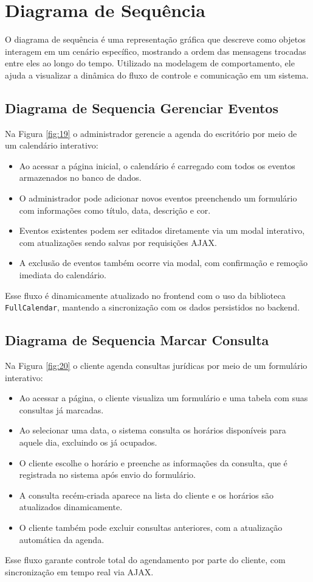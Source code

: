 \section{Diagrama de Sequência}
O diagrama de sequência é uma representação gráfica que descreve como objetos interagem em um cenário específico, mostrando a ordem das mensagens trocadas entre eles ao longo do tempo. Utilizado na modelagem de comportamento, ele ajuda a visualizar a dinâmica do fluxo de controle e comunicação em um sistema.


\subsection{Diagrama de Sequencia Gerenciar Eventos}

Na Figura \ref{fig:19} o administrador gerencie a agenda do escritório por meio de um calendário interativo:

\begin{itemize} \item Ao acessar a página inicial, o calendário é carregado com todos os eventos armazenados no banco de dados. \item O administrador pode adicionar novos eventos preenchendo um formulário com informações como título, data, descrição e cor. \item Eventos existentes podem ser editados diretamente via um modal interativo, com atualizações sendo salvas por requisições AJAX. \item A exclusão de eventos também ocorre via modal, com confirmação e remoção imediata do calendário. \end{itemize}
Esse fluxo é dinamicamente atualizado no frontend com o uso da biblioteca \texttt{FullCalendar}, mantendo a sincronização com os dados persistidos no backend.


\subsection{Diagrama de Sequencia Marcar Consulta}

Na Figura \ref{fig:20} o cliente agenda consultas jurídicas por meio de um formulário interativo:

\begin{itemize} \item Ao acessar a página, o cliente visualiza um formulário e uma tabela com suas consultas já marcadas. \item Ao selecionar uma data, o sistema consulta os horários disponíveis para aquele dia, excluindo os já ocupados. \item O cliente escolhe o horário e preenche as informações da consulta, que é registrada no sistema após envio do formulário. \item A consulta recém-criada aparece na lista do cliente e os horários são atualizados dinamicamente. \item O cliente também pode excluir consultas anteriores, com a atualização automática da agenda. 
\end{itemize}
Esse fluxo garante controle total do agendamento por parte do cliente, com sincronização em tempo real via AJAX.

